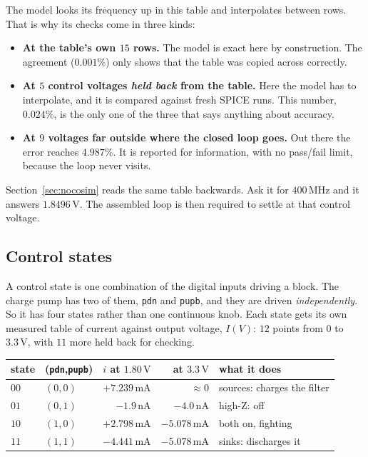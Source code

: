 \documentclass[11pt,a4paper]{article}
\newcommand{\unit}[1]{\,\textrm{#1}}
\begin{document}
\noindent The model looks its frequency up in this table and
interpolates between rows. That is why its checks come in three kinds:
\begin{itemize}
\item \textbf{At the table's own $15$ rows.} The model is exact here by
  construction. The agreement ($0.001\%$) only shows that the table was
  copied across correctly.
\item \textbf{At $5$ control voltages \emph{held back} from the table.}
  Here the model has to interpolate, and it is compared against fresh
  SPICE runs. This number, $0.024\%$, is the only one of the three that
  says anything about accuracy.
\item \textbf{At $9$ voltages far outside where the closed loop goes.}
  Out there the error reaches $4.987\%$. It is reported for
  information, with no pass/fail limit, because the loop never visits.
\end{itemize}

Section~\ref{sec:nocosim} reads the same table backwards. Ask it for
$400\unit{MHz}$ and it answers $1.8496\unit{V}$. The assembled loop is
then required to settle at that control voltage.

\subsection{Control states}

\noindent A control state is one combination of the digital inputs
driving a block. The charge pump has two of them, \texttt{pdn} and
\texttt{pupb}, and they are driven \emph{independently}. So it has
four states rather than one continuous knob. Each state gets its own
measured table of current against output voltage, $I(V)$: $12$ points
from $0$ to $3.3\unit{V}$, with $11$ more held back for checking.

\begin{center}
\begin{tabular}{@{}llrrl@{}}
\toprule
\textbf{state} & \textbf{(\texttt{pdn},\texttt{pupb})}
  & \textbf{$i$ at $1.80\unit{V}$} & \textbf{at $3.3\unit{V}$}
  & \textbf{what it does} \\
\midrule
$00$ & $(0,0)$ & $+7.239\unit{mA}$ & $\approx 0$          & sources: charges the filter \\
$01$ & $(0,1)$ & $-1.9\unit{nA}$   & $-4.0\unit{nA}$      & high-Z: off \\
$10$ & $(1,0)$ & $+2.798\unit{mA}$ & $-5.078\unit{mA}$    & both on, fighting \\
$11$ & $(1,1)$ & $-4.441\unit{mA}$ & $-5.078\unit{mA}$    & sinks: discharges it \\
\bottomrule
\end{tabular}
\end{center}
\end{document}
